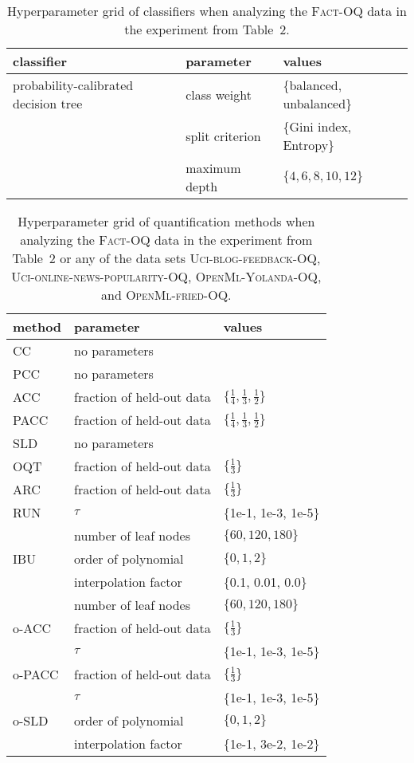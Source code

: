 \documentclass[10pt,a4paper]{article}
\begin{document}
\begin{table}
  \centering
  \caption{Hyperparameter grid of classifiers when analyzing the
  \textsc{Fact-OQ} data in the experiment from Table~2.}
  \label{tab:hyperparameter-fact-classifier}
  \footnotesize
  \begin{tabular}{lll}
    \toprule
    classifier & parameter & values \\
    \midrule
    probability-calibrated decision tree & class weight & \{balanced, unbalanced\} \\
               & split criterion & \{Gini index, Entropy\} \\
               & maximum depth & $\{4, 6, 8, 10, 12\}$ \\
    \bottomrule
  \end{tabular}
\end{table}

\begin{table}
  \centering
  \caption{Hyperparameter grid of quantification methods when
  analyzing the \textsc{Fact-OQ} data in the experiment from Table~2
  or any of the data sets \textsc{Uci-blog-feedback-OQ},
  \textsc{Uci-online-news-popularity-OQ}, \textsc{OpenMl-Yolanda-OQ},
  and \textsc{OpenMl-fried-OQ}.}
  \label{tab:hyperparameter-fact-quantifier}
  \footnotesize
  \begin{tabular}{lll}
    \toprule
    method & parameter & values \\
    \midrule
    CC & no parameters & \\
    PCC & no parameters & \\
    ACC & fraction of held-out data & $\{\frac{1}{4}, \frac{1}{3}, \frac{1}{2}\}$ \\
    PACC & fraction of held-out data & $\{\frac{1}{4}, \frac{1}{3}, \frac{1}{2}\}$ \\
    SLD & no parameters & \\
    \midrule
    OQT & fraction of held-out data & $\{\frac{1}{3}\}$ \\
    ARC & fraction of held-out data & $\{\frac{1}{3}\}$ \\
    RUN & $\tau$ & $\{$1e-1, 1e-3, 1e-5$\}$ \\
           & number of leaf nodes & $\{60, 120, 180\}$ \\
    IBU & order of polynomial & $\{0, 1, 2\}$ \\
           & interpolation factor & $\{$0.1, 0.01, 0.0$\}$ \\
           & number of leaf nodes & $\{60, 120, 180\}$ \\
    \midrule
    o-ACC & fraction of held-out data & $\{\frac{1}{3}\}$ \\
           & $\tau$ & $\{$1e-1, 1e-3, 1e-5$\}$ \\
    o-PACC & fraction of held-out data & $\{\frac{1}{3}\}$ \\
           & $\tau$ & $\{$1e-1, 1e-3, 1e-5$\}$ \\
    o-SLD & order of polynomial & $\{0, 1, 2\}$ \\
           & interpolation factor & $\{$1e-1, 3e-2, 1e-2$\}$ \\
    \bottomrule
  \end{tabular}
\end{table}
\end{document}
